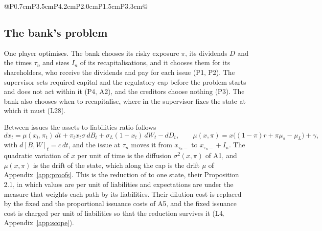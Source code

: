 \begin{longtable}{@{}P{0.7cm}P{3.5cm}P{4.2cm}P{2.0cm}P{1.5cm}P{3.3cm}@{}}
\bottomrule
\end{longtable}
\normalsize

\subsection{The bank's problem}
\label{sec:problem}

One player optimises. The bank chooses its risky exposure $\pi$, its dividends
$D$ and the times $\tau_n$ and sizes $I_n$ of its recapitalisations, and it
chooses them for its shareholders, who receive the dividends and pay for each
issue (P1, P2). The supervisor sets required capital and the regulatory cap
before the problem starts and does not act within it (P4, A2), and the
creditors choose nothing (P3). The bank also chooses when to recapitalise,
where in \citet{bayraktar2026} the supervisor fixes the state at which it must
(L28).

Between issues the assets-to-liabilities ratio follows
\[
dx_t=\mu(x_t,\pi_t)\,dt+\pi_tx_t\sigma\,dB_t+\sigma_L(1-x_t)\,dW_t-dD_t,\qquad
\mu(x,\pi)=x\big((1-\pi)r+\pi\mu_s-\mu_L\big)+\gamma,
\]
with $d[B,W]_t=c\,dt$, and the issue at $\tau_n$ moves it from $x_{\tau_n-}$
to $x_{\tau_n-}+I_n$. The quadratic variation of $x$ per unit of time is the
diffusion $\sigma^2(x,\pi)$ of A1, and $\mu(x,\pi)$ is the drift of the state,
which along the cap is the drift $\mu$ of Appendix~\ref{app:proofs}. This is
the reduction of \citet{bayraktar2026} to one state, their Proposition 2.1, in
which values are per unit of liabilities and expectations are under the
measure that weights each path by its liabilities. Their dilution cost is
replaced by the fixed and the proportional issuance costs of A5, and the fixed
issuance cost is charged per unit of liabilities so that the reduction survives
it (L4, Appendix~\ref{app:scope}).

